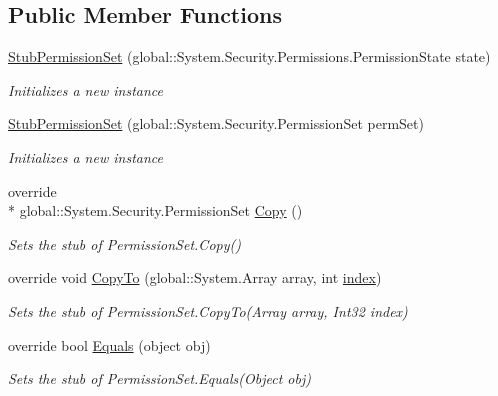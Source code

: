 \subsection*{Public Member Functions}
\begin{DoxyCompactItemize}
\item 
\hyperlink{class_system_1_1_security_1_1_fakes_1_1_stub_permission_set_a33e2731d8edfe8a4735d935eaf7ef89d}{Stub\-Permission\-Set} (global\-::\-System.\-Security.\-Permissions.\-Permission\-State state)
\begin{DoxyCompactList}\small\item\em Initializes a new instance\end{DoxyCompactList}\item 
\hyperlink{class_system_1_1_security_1_1_fakes_1_1_stub_permission_set_a2998307793dcf95ce013e6f6ba3088e4}{Stub\-Permission\-Set} (global\-::\-System.\-Security.\-Permission\-Set perm\-Set)
\begin{DoxyCompactList}\small\item\em Initializes a new instance\end{DoxyCompactList}\item 
override \\*
global\-::\-System.\-Security.\-Permission\-Set \hyperlink{class_system_1_1_security_1_1_fakes_1_1_stub_permission_set_adc59b3a87cfa953745ad55ff661d6a01}{Copy} ()
\begin{DoxyCompactList}\small\item\em Sets the stub of Permission\-Set.\-Copy()\end{DoxyCompactList}\item 
override void \hyperlink{class_system_1_1_security_1_1_fakes_1_1_stub_permission_set_a1c6e19939f39dadce371e21c03139391}{Copy\-To} (global\-::\-System.\-Array array, int \hyperlink{jquery-1_810_82-vsdoc_8js_a75bb12d1f23302a9eea93a6d89d0193e}{index})
\begin{DoxyCompactList}\small\item\em Sets the stub of Permission\-Set.\-Copy\-To(\-Array array, Int32 index)\end{DoxyCompactList}\item 
override bool \hyperlink{class_system_1_1_security_1_1_fakes_1_1_stub_permission_set_a35ab751453b644ff03857980246d2ded}{Equals} (object obj)
\begin{DoxyCompactList}\small\item\em Sets the stub of Permission\-Set.\-Equals(\-Object obj)\end{DoxyCompactList}\item 

\end{DoxyCompactItemize}
